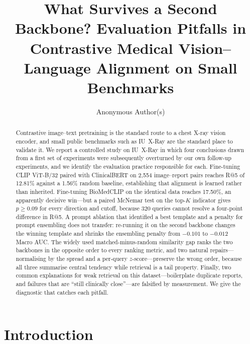 \documentclass[runningheads]{llncs}
\begin{document}
\title{What Survives a Second Backbone? Evaluation Pitfalls in\\Contrastive
Medical Vision--Language Alignment on Small Benchmarks}

\author{Anonymous Author(s)}

\maketitle

\begin{abstract}
Contrastive image--text pretraining is the standard route to a chest X-ray vision
encoder, and small public benchmarks such as IU~X-Ray are the standard place to
validate it. We report a controlled study on IU~X-Ray in which four conclusions
drawn from a first set of experiments were subsequently overturned by our own
follow-up experiments, and we identify the evaluation practice responsible for
each. Fine-tuning CLIP ViT-B/32 paired with ClinicalBERT on 2{,}554 image--report
pairs reaches R@5 of 12.81\% against a 1.56\% random baseline, establishing that
alignment is learned rather than inherited. Fine-tuning BioMedCLIP on the
identical data reaches 17.50\%, an apparently decisive win---but a paired McNemar
test on the top-$K$ indicator gives $p \geq 0.09$ for every direction and cutoff,
because 320 queries cannot resolve a four-point difference in R@5. A prompt
ablation that identified a best template and a penalty for prompt ensembling does
not transfer: re-running it on the second backbone changes the winning template
and shrinks the ensembling penalty from $-0.101$ to $-0.012$ Macro AUC. The
widely used matched-minus-random similarity gap ranks the two backbones in the
opposite order to every ranking metric, and two natural repairs---normalising by
the spread and a per-query $z$-score---preserve the wrong order, because all
three summarise central tendency while retrieval is a tail property. Finally,
two common explanations for weak retrieval on this dataset---boilerplate
duplicate reports, and failures that are ``still clinically close''---are
falsified by measurement. We give the diagnostic that catches each pitfall.

\end{abstract}

\section{Introduction}
\end{document}
